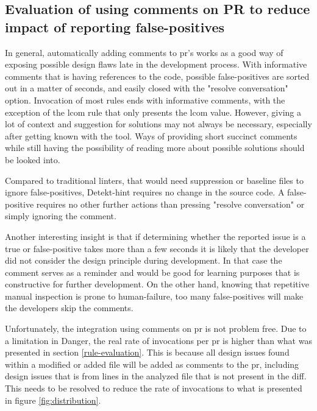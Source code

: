 \documentclass[pdftex,10pt,b5paper,twoside]{report}
\begin{document}
\begin{itemize}
\end{itemize}




\subsection{Evaluation of using comments on PR to reduce impact of reporting false-positives}
\label{evaluation-comments}
In general, automatically adding comments to \gls{pr}'s works as a good way of exposing possible design flaws late in the development process. With informative comments that is having references to the code, possible false-positives are sorted out in a matter of seconds, and easily closed with the "resolve conversation" option. Invocation of most rules ends with informative comments, with the exception of the \gls{lcom} rule that only presents the \gls{lcom} value. However, giving a lot of context and suggestion for solutions may not always be necessary, especially after getting known with the tool. Ways of providing short succinct comments while still having the possibility of reading more about possible solutions should be looked into.

Compared to traditional linters, that would need suppression or baseline files to ignore false-positives, Detekt-hint requires no change in the source code. A false-positive requires no other further actions than pressing "resolve conversation" or simply ignoring the comment.  

Another interesting insight is that if determining whether the reported issue is a true or false-positive takes more than a few seconds it is likely that the developer did not consider the design principle during development. In that case the comment serves as a reminder and would be good for learning purposes that is constructive for further development. On the other hand, knowing that repetitive manual inspection is prone to human-failure, too many false-positives will make the developers skip the comments.

Unfortunately, the integration using comments on \gls{pr} is not problem free. Due to a limitation in Danger, the real rate of invocations per \gls{pr} is higher than what was presented in section \ref{rule-evaluation}. This is because all design issues found within a modified or added file will be added as comments to the pr, including design issues that is from lines in the analyzed file that is not present in the diff. This needs to be resolved to reduce the rate of invocations to what is presented in figure \ref{fig:distribution}.
\end{document}
